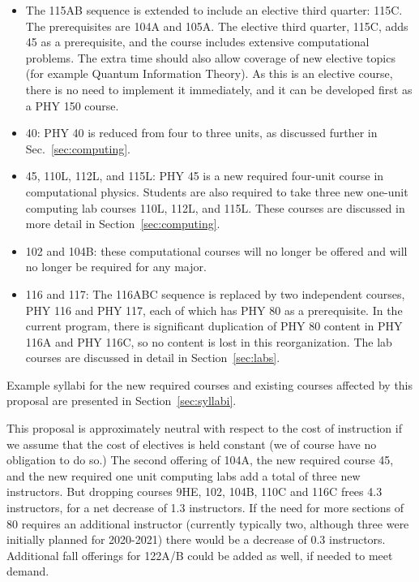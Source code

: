 \documentclass[12pt]{article}
\begin{document}
\begin{itemize}
\item The 115AB sequence is extended to include an elective third
  quarter: 115C.  The prerequisites are 104A and 105A.  The elective
  third quarter, 115C, adds 45 as a prerequisite, and the course
  includes extensive computational problems.  The extra time should
  also allow coverage of new elective topics (for example Quantum
  Information Theory).  As this is an elective course, there is no
  need to implement it immediately, and it can be developed first as a
  PHY 150 course.

\item 40: PHY 40 is reduced from four to three units, as discussed
  further in Sec.~\ref{sec:computing}.
    
\item 45, 110L, 112L, and 115L: PHY 45 is a new required four-unit
  course in computational physics.  Students are also required to take
  three new one-unit computing lab courses 110L, 112L,
  and 115L.  These courses are discussed in more detail in
  Section~\ref{sec:computing}.

\item 102 and 104B: these computational courses will no longer be
  offered and will no longer be required for any major.

\item 116 and 117: The 116ABC sequence is replaced by two independent
  courses, PHY 116 and PHY 117, each of which has PHY 80 as a
  prerequisite.  In the current program, there is significant
  duplication of PHY 80 content in PHY 116A and PHY 116C, so no
  content is lost in this reorganization.  The lab courses are
  discussed in detail in Section~\ref{sec:labs}.
\end{itemize}
Example syllabi for the new required courses and existing courses
affected by this proposal are presented in Section~\ref{sec:syllabi}.

This proposal is approximately neutral with respect to the cost of
instruction if we assume that the cost of electives is held constant
(we of course have no obligation to do so.)  The second offering of
104A, the new required course 45, and the new required one unit
computing labs add a total of three new instructors.  But dropping
courses 9HE, 102, 104B, 110C and 116C frees 4.3 instructors, for a net
decrease of 1.3 instructors.  If the need for more sections of 80
requires an additional instructor (currently typically two, although
three were initially planned for 2020-2021) there would be a decrease
of 0.3 instructors.  Additional fall offerings for 122A/B could be
added as well, if needed to meet demand.
\end{document}
